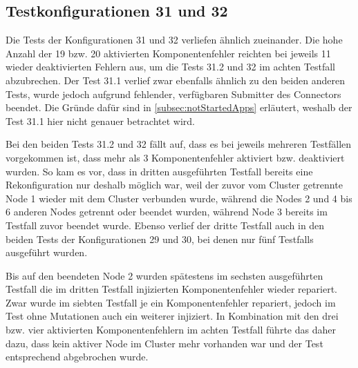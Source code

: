 \subsection{Testkonfigurationen 31 und 32}
\label{subsec:noReconf3132}

Die \glspl{Test} der Konfigurationen 31 und 32 verliefen ähnlich zueinander.
Die hohe Anzahl der 19 bzw. 20 aktivierten Komponentenfehler reichten bei jeweils 11 wieder deaktivierten Fehlern aus, um die \glspl{Test} 31.2 und 32 im achten \gls{Testfall} abzubrechen.
Der \gls{Test} 31.1 verlief zwar ebenfalls ähnlich zu den beiden anderen Tests, wurde jedoch aufgrund fehlender, verfügbaren Submitter des Connectors beendet.
Die Gründe dafür sind in \cref{subsec:notStartedApps} erläutert, weshalb der \gls{Test} 31.1 hier nicht genauer betrachtet wird.

Bei den beiden \glspl{Test} 31.2 und 32 fällt auf, dass es bei jeweils mehreren Testfällen vorgekommen ist, dass mehr als 3 Komponentenfehler aktiviert bzw. deaktiviert wurden.
So kam es vor, dass \zB in dritten ausgeführten \gls{Testfall} bereits eine Rekonfiguration nur deshalb möglich war, weil der zuvor vom Cluster getrennte Node 1 wieder mit dem Cluster verbunden wurde, während die Nodes 2 und 4 bis 6 anderen Nodes getrennt oder beendet wurden, während Node 3 bereits im \gls{Testfall} zuvor beendet wurde.
Ebenso verlief der dritte \gls{Testfall} auch in den beiden \glspl{Test} der Konfigurationen 29 und 30, bei denen nur fünf \glspl{Testfall} ausgeführt wurden.

Bis auf den beendeten Node 2 wurden spätestens im sechsten ausgeführten \gls{Testfall} die im dritten \gls{Testfall} injizierten Komponentenfehler wieder repariert.
Zwar wurde im siebten \gls{Testfall} je ein Komponentenfehler repariert, jedoch im \gls{Test} ohne Mutationen auch ein weiterer injiziert.
In Kombination mit den drei bzw. vier aktivierten Komponentenfehlern im achten \gls{Testfall} führte das daher dazu, dass kein aktiver Node im Cluster mehr vorhanden war und der \gls{Test} entsprechend abgebrochen wurde.
